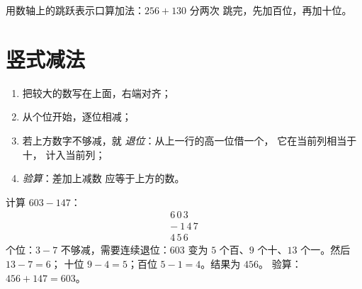 \begin{omfigure}

{\small 用数轴上的跳跃表示口算加法：$256 + 130$ 分两次
跳完，先加百位，再加十位。}
\end{omfigure}

\section{竖式减法}

\begin{method}[竖式减法]\label{met:g3:addsub:sub}
\begin{enumerate}
  \item 把较大的数写在上面，右端对齐；
  \item 从个位开始，逐位相减；
  \item 若上方数字不够减，就 \emph{退位}：从上一行的高一位借一个，
        它在当前列相当于十，
        计入当前列；
  \item \emph{验算}：差加上减数
        应等于上方的数。
\end{enumerate}
\end{method}

\begin{example}\label{ex:g3:addsub:sub}
计算 $603 - 147$：
\[
\begin{array}{r}
6\,0\,3 \\
-\ 1\,4\,7 \\
\hline
4\,5\,6
\end{array}
\]
个位：$3 - 7$ 不够减，需要连续退位：$603$ 变为
$5$ 个百、$9$ 个十、$13$ 个一。然后 $13 - 7 = 6$；
十位 $9 - 4 = 5$；百位 $5 - 1 = 4$。结果为 $456$。
验算：$456 + 147 = 603$。
\end{example}

